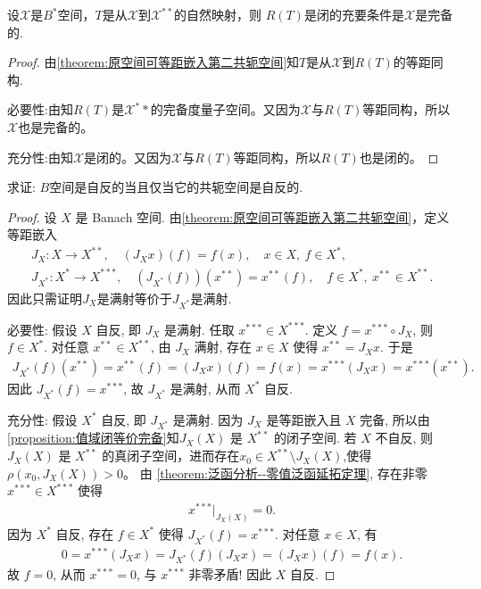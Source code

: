 \documentclass[../../main.tex]{subfiles}%
\begin{document}
\begin{proposition}\label{proposition:值域闭等价完备}
设$\mathscr{X}$是$B^*$空间，$T$是从$\mathscr{X}$到$\mathscr{X}^{**}$的自然映射，则 $R(T)$是闭的充要条件是$\mathscr{X}$是完备的.
\end{proposition}
\begin{proof}

由\cref{theorem:原空间可等距嵌入第二共轭空间}知$T$是从$\mathscr{X}$到$R(T)$的等距同构.

{\heiti 必要性:}由知$R(T)$是$\mathscr{X}^**$的完备度量子空间。又因为$\mathscr{X}$与$R(T)$等距同构，所以$\mathscr{X}$也是完备的。

{\heiti 充分性:}由知$\mathscr{X}$是闭的。又因为$\mathscr{X}$与$R(T)$等距同构，所以$R(T)$也是闭的。
\end{proof}

\begin{proposition}
求证: $B$空间是自反的当且仅当它的共轭空间是自反的.
\end{proposition}
\begin{proof}
设 $X$ 是 Banach 空间. 由\cref{theorem:原空间可等距嵌入第二共轭空间}，定义等距嵌入
\begin{gather*}
J_X:X\to X^{**},\quad (J_X x)(f)=f(x),\quad x\in X,\ f\in X^*,\\
J_{X^*}:X^*\to X^{***},\quad (J_{X^*}(f))(x^{**})=x^{**}(f),\quad f\in X^*,\ x^{**}\in X^{**}.
\end{gather*}
因此只需证明$J_X$是满射等价于$J_{X^*}$是满射.

{\heiti 必要性:} 假设 $X$ 自反, 即 $J_X$ 是满射. 任取 $x^{***}\in X^{***}$. 定义 $f=x^{***}\circ J_X$, 则 $f\in X^*$. 对任意 $x^{**}\in X^{**}$, 由 $J_X$ 满射, 存在 $x\in X$ 使得 $x^{**}=J_Xx$. 于是
\begin{align*}
J_{X^*}(f)(x^{**})=x^{**}(f)=(J_Xx)(f)=f(x)=x^{***}(J_Xx)=x^{***}(x^{**}).
\end{align*}
因此 $J_{X^*}(f)=x^{***}$, 故 $J_{X^*}$ 是满射, 从而 $X^*$ 自反.

{\heiti 充分性:} 假设 $X^*$ 自反, 即 $J_{X^*}$ 是满射. 因为 $J_X$ 是等距嵌入且 $X$ 完备, 所以由\cref{proposition:值域闭等价完备}知$J_X(X)$ 是 $X^{**}$ 的闭子空间. 若 $X$ 不自反, 则 $J_X(X)$ 是 $X^{**}$ 的真闭子空间，进而存在$x_0\in X^{**}\setminus J_X(X)$,使得$\rho(x_0,J_X(X))>0$。 由 \cref{theorem:泛函分析--零值泛函延拓定理}, 存在非零 $x^{***}\in X^{***}$ 使得
\begin{align*}
x^{***}|_{J_X(X)}=0.
\end{align*}
因为 $X^*$ 自反, 存在 $f\in X^*$ 使得 $J_{X^*}(f)=x^{***}$. 对任意 $x\in X$, 有
\begin{align*}
0=x^{***}(J_Xx)=J_{X^*}(f)(J_Xx)=(J_Xx)(f)=f(x).
\end{align*}
故 $f=0$, 从而 $x^{***}=0$, 与 $x^{***}$ 非零矛盾! 因此 $X$ 自反.
\end{proof}
\end{document}
